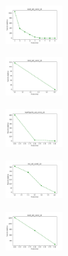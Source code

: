 \begin{figure}[H]
    \begin{subfigure}
        \centering
        \includegraphics[width=0.234\textwidth]{img/copkm2/ecoli_set_const_10_589741062_cost.png}
    \end{subfigure}
    \hfill
    \begin{subfigure}
        \centering
        \includegraphics[width=0.234\textwidth]{img/copkm2/rand_set_const_10_589741062_cost.png}
    \end{subfigure}
    \hfill
    \begin{subfigure}
        \centering
        \includegraphics[width=0.234\textwidth]{img/copkm2/newthyroid_set_const_10_589741062_cost.png}
    \end{subfigure}
    \hfill
    \begin{subfigure}
        \centering
        \includegraphics[width=0.234\textwidth]{img/copkm2/iris_set_const_10_277451237_cost.png}
    \end{subfigure}
    \hfill
    \begin{subfigure}
        \centering
        \includegraphics[width=0.234\textwidth]{img/copkm2/ecoli_set_const_10_277451237_cost.png}
    \end{subfigure}
    \hfill
    \begin{subfigure}

\end{subfigure}
\end{figure}
